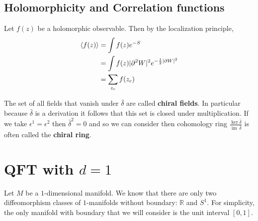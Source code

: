 \documentclass{report}
\theoremstyle{plain}
\theoremstyle{definition}
\theoremstyle{remark}
\newcommand{\di}{\partial}
\newcommand{\bC}{\mathbb{C}}
\newcommand{\bR}{\mathbb{R}}
\DeclareMathOperator{\im}{im}
\newcommand{\mc}{\mathcal}
\newcommand{\FR}[2]{\frac{#1}{#2}}
\begin{document}
\subsection{Holomorphicity and Correlation functions}

Let $f(z)$ be a holomorphic observable. Then by the localization principle,
\begin{align*}
    \braket{f(z)} &= \int f(z) e^{-S}\\
    &= \int f(z)|\di^2 W|^2 e^{-\FR{1}{2}|\di W|^2}\\
    &= \sum_{z_c} f(z_c)
\end{align*}

The set of all fields that vanish under $\bar\delta$ are called
\textbf{chiral fields}. In particular because $\bar\delta$ is a derivation
it follows that this set is closed under multiplication. If we take
$\epsilon^1=\epsilon^2$ then $\bar\delta^2 = 0$ and so we can consider then
cohomology ring $\FR{\ker\bar\delta}{\im\,\bar\delta}$ is often called the
\textbf{chiral ring}.

\section{QFT with \texorpdfstring{$d=1$}{d=1}}
Let $M$ be a $1$-dimensional manifold. We know that there are only two
diffeomorphism classes of $1$-manifolds without boundary: $\bR$ and $S^1$.
For simplicity, the only manifold with boundary that we will consider is
the unit interval $[0,1]$.
\end{document}
